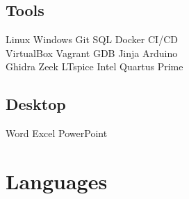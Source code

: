 \documentclass[]{deedy-resume-openfont}
\begin{document}
\begin{minipage}[t]{0.35\textwidth}
\vspace{5pt}

\subsection{Tools}
Linux \textbullet{} Windows \textbullet{} Git \textbullet{} SQL \textbullet{} Docker \textbullet{} CI/CD \\
VirtualBox \textbullet{} Vagrant \textbullet{} GDB \textbullet{} Jinja \textbullet{} Arduino \\
Ghidra \textbullet{} Zeek \textbullet{} LTspice \textbullet{} Intel Quartus Prime

\vspace{5pt}

\subsection{Desktop}
Word \textbullet{} Excel \textbullet{} PowerPoint


\vspace{8pt}
\section{Languages}


\end{minipage}
\end{document}
